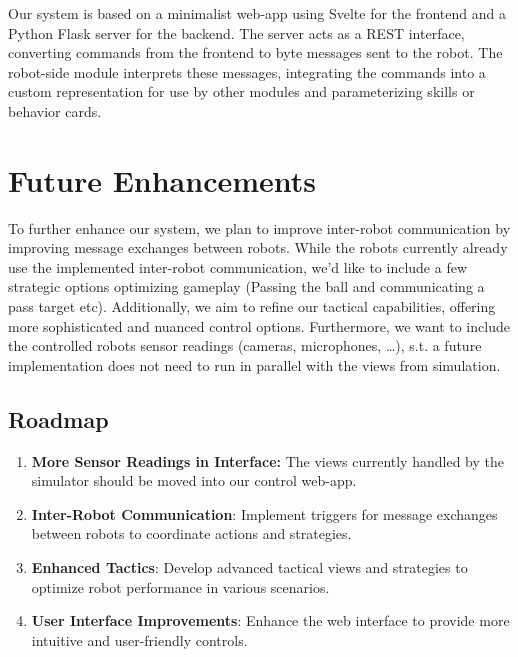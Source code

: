 \documentclass[a4paper]{article}
\begin{document}
Our system is based on a minimalist web-app using Svelte for the frontend and a Python Flask server for the backend.
The server acts as a REST interface, converting commands from the frontend to byte messages sent to the robot.
The robot-side module interprets these messages, integrating the commands into a custom representation for use by other modules and parameterizing skills or behavior cards.

\section{Future Enhancements}

To further enhance our system, we plan to improve inter-robot communication by improving message exchanges between robots. 
While the robots currently already use the implemented inter-robot communication, we'd like to include a few strategic options optimizing gameplay (Passing the ball and communicating a pass target etc).
Additionally, we aim to refine our tactical capabilities, offering more sophisticated and nuanced control options.
Furthermore, we want to include the controlled robots sensor readings (cameras, microphones, \dots), s.t. a future implementation does not need to run in parallel with the views from simulation.


\subsection{\textbf{Roadmap}}

\begin{enumerate}
	\item \textbf{More Sensor Readings in Interface:} The views currently handled by the simulator should be moved into our control web-app.
    \item \textbf{Inter-Robot Communication}: Implement triggers for message exchanges between robots to coordinate actions and strategies.
    \item \textbf{Enhanced Tactics}: Develop advanced tactical views and strategies to optimize robot performance in various scenarios.
    \item \textbf{User Interface Improvements}: Enhance the web interface to provide more intuitive and user-friendly controls.
\end{enumerate}
\end{document}

